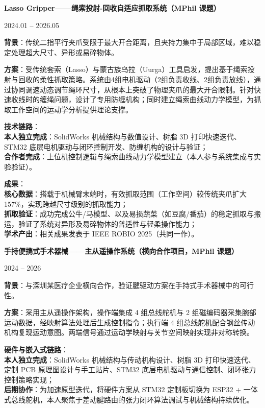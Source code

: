 \documentclass[11pt,a4paper]{article}
\newcommand{\cvdate}[1]{\hfill\textcolor{midgray}{\small #1}}
\newcommand{\projectsection}[1]{\vspace{0.25em}\textbf{#1}\par\vspace{0.03em}}
\newcommand{\projectlabel}[1]{\textbf{\small #1}：}
\begin{document}
\projectsection{Lasso Gripper——绳索投射-回收自适应抓取系统（MPhil 课题）} \cvdate{2024.01 -- 2026.05}

{\projectlabel{背景}传统二指平行夹爪受限于最大开合距离，且夹持力集中于局部区域，难以稳定处理超大尺寸、异形或易碎物体。}

{\projectlabel{方案}受传统套索（Lasso）与蒙古族乌拉（Uurga）工具启发，提出基于绳索投射与回收的柔性抓取策略。系统由4组电机驱动（2组负责收线、2组负责放线），通过协同调速动态调节绳环尺寸，从根本上突破了物理夹爪的最大开合限制。针对快速收线时的缠绳问题，设计了专用防缠机构；同时建立绳索曲线动力学模型，为抓取工作空间的运动学分析提供理论支撑。}

{\projectlabel{技术链路}\\
\textbf{本人独立完成}：SolidWorks 机械结构与数值设计、树脂 3D 打印快速迭代、STM32 底层电机驱动与闭环控制开发、防缠机构的设计与验证；\\
\textbf{合作者完成}：上位机控制逻辑与绳索曲线动力学模型建立（本人参与系统集成与实验验证）。}

{\projectlabel{成果}\\
\textbf{核心数据}：搭载于机械臂末端时，有效抓取范围（工作空间）较传统夹爪扩大 157\%，实现跨越尺寸级别的抓取能力；\\
\textbf{抓取验证}：成功完成公牛/马模型、以及易损蔬菜（如豆腐/番茄）的稳定抓取与搬运，验证了系统对异形及易碎物体的普适性与轻柔操作能力；\\
\textbf{学术产出}：相关成果发表于 IEEE ROBIO 2025（共同一作）。}


\projectsection{手持便携式手术器械——主从遥操作系统（横向合作项目，MPhil 课题）} \cvdate{2024 -- 2026}

{\projectlabel{背景}与深圳某医疗企业横向合作，验证腱驱动方案在手持式手术器械中的可行性。}

{\projectlabel{方案}采用主从遥操作架构，操作端集成 4 组总线舵机与 2 组磁编码器采集腕部运动数据，经映射算法处理后生成控制指令；执行端 4 组总线舵机配合钢丝传动机构复现运动意图。两端信号通过运动学映射与关节空间映射实现非对称转换。}

{\projectlabel{硬件与嵌入式链路}\\
\textbf{本人独立完成}：SolidWorks 机械结构与传动机构设计、树脂 3D 打印快速迭代、定制 PCB 原理图设计与手工贴片、STM32 底层电机驱动与通信控制、闭环张力控制策略实现；\\
\textbf{后期协作}：为加速原型迭代，将硬件方案从 STM32 定制板切换为 ESP32 + 一体式总线舵机，本人聚焦于差动腱路由的张力闭环算法调试与机械结构持续优化。}
\end{document}
